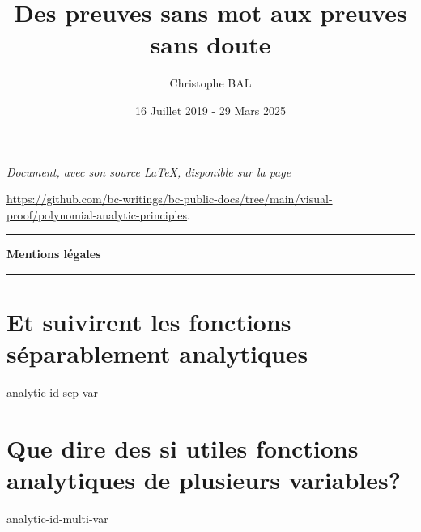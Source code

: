 \documentclass[12pt]{amsart}
\begin{document}
\title{Des preuves sans mot aux preuves sans doute}
\author{Christophe BAL}
\date{16 Juillet 2019 - 29 Mars 2025}

\maketitle

\begin{center}
	\itshape
	Document, avec son source \LaTeX, disponible sur la page

	\url{https://github.com/bc-writings/bc-public-docs/tree/main/visual-proof/polynomial-analytic-principles}.
\end{center}


\bigskip


\begin{center}
	\hrule\vspace{.3em}
	{
		\fontsize{1.35em}{1em}\selectfont
		\textbf{Mentions \og légales \fg}
	}

	\vspace{0.45em}
	\doclicenseThis
	\hrule
\end{center}


\bigskip


\setcounter{tocdepth}{1}
\tableofcontents



\newpage

%
%
%
%
%
%
%
%
%
%
%
%
%
%
\newpage
\section{Et suivirent les fonctions séparablement analytiques}

{analytic-id-sep-var}




\newpage
\section{Que dire des si utiles fonctions analytiques de plusieurs variables?}

{analytic-id-multi-var}
\end{document}

